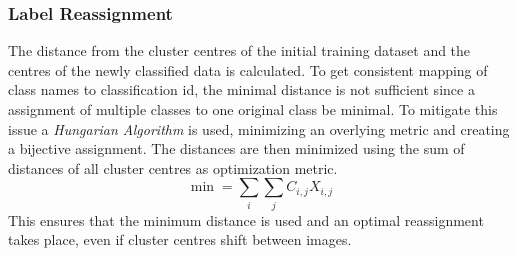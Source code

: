 \documentclass[12pt,a4paper, english,twoside]{scrartcl}
\begin{document}
   \subsubsection{Label Reassignment}\label{sec:labelassignment}
    The distance from the cluster centres of the initial training dataset and the centres of the newly classified data is calculated. 
    To get consistent mapping of class names to classification id, the minimal distance is not sufficient since a assignment of multiple classes to one original class be minimal. 
    To mitigate this issue a \textit{Hungarian Algorithm} is used, minimizing an overlying metric and creating a bijective assignment. 
    The distances are then minimized using the sum of distances of all cluster centres as optimization metric.
      \begin{equation}
        \min = \sum_{i}\sum_{j} C_{i,j}X_{i,j}
      \end{equation}
    This ensures that the minimum distance is used and an optimal reassignment takes place, even if cluster centres shift between images.
\end{document}
